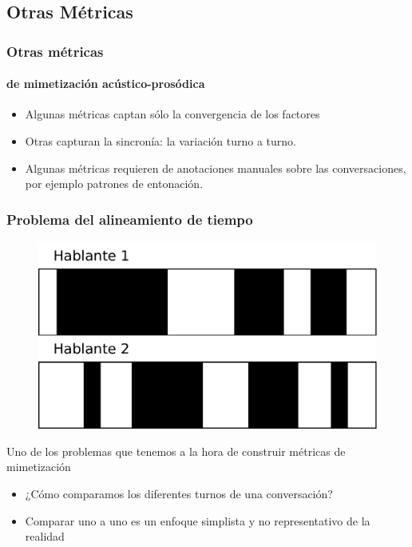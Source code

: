 
\subsection{Otras Métricas }

\begin{frame}
  \frametitle{Otras métricas}
  \framesubtitle{de mimetización acústico-prosódica}
  \begin{itemize}
    \item Algunas métricas captan sólo la convergencia de los factores
    \item Otras capturan la sincronía: la variación turno a turno.
    \item Algunas métricas requieren de anotaciones manuales sobre las conversaciones, por ejemplo patrones de entonación.
  \end{itemize}

\end{frame}


\begin{frame}
  \frametitle{Problema del alineamiento de tiempo}

  \begin{figure}[t]
    \includegraphics[scale=0.40]{images/conversation_turns.pdf}
  \end{figure}
  Uno de los problemas que tenemos a la hora de construir métricas de mimetización

  \begin{itemize}
    \item ¿Cómo comparamos los diferentes turnos de una conversación?
    \item Comparar uno a uno es un enfoque simplista y no representativo de la realidad
  \end{itemize}
\end{frame}


